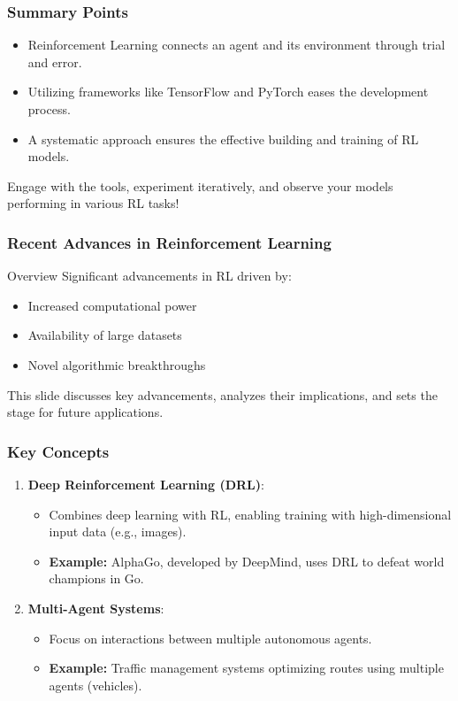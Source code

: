 \documentclass[aspectratio=169]{beamer}
\begin{document}
\begin{frame}[fragile]
    \frametitle{Summary Points}
    \begin{itemize}
        \item Reinforcement Learning connects an agent and its environment through trial and error.
        \item Utilizing frameworks like TensorFlow and PyTorch eases the development process.
        \item A systematic approach ensures the effective building and training of RL models.
    \end{itemize}
    Engage with the tools, experiment iteratively, and observe your models performing in various RL tasks!
\end{frame}

\begin{frame}
    \frametitle{Recent Advances in Reinforcement Learning}
    \begin{block}{Overview}
        Significant advancements in RL driven by:
        \begin{itemize}
            \item Increased computational power
            \item Availability of large datasets
            \item Novel algorithmic breakthroughs
        \end{itemize}
        This slide discusses key advancements, analyzes their implications, and sets the stage for future applications.
    \end{block}
\end{frame}

\begin{frame}
    \frametitle{Key Concepts}
    \begin{enumerate}
        \item \textbf{Deep Reinforcement Learning (DRL)}:
            \begin{itemize}
                \item Combines deep learning with RL, enabling training with high-dimensional input data (e.g., images).
                \item \textbf{Example:} AlphaGo, developed by DeepMind, uses DRL to defeat world champions in Go.
            \end{itemize}
        \item \textbf{Multi-Agent Systems}:
            \begin{itemize}
                \item Focus on interactions between multiple autonomous agents.
                \item \textbf{Example:} Traffic management systems optimizing routes using multiple agents (vehicles).
            \end{itemize}
    \end{enumerate}
\end{frame}
\end{document}
